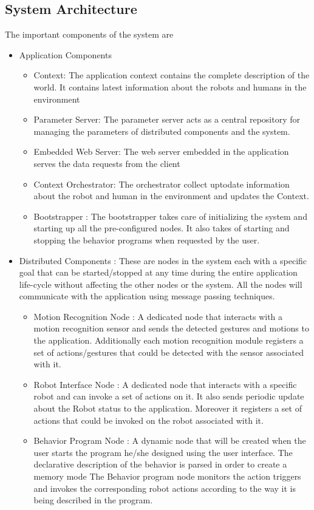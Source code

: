 \documentclass{llncs}
\begin{document}
\subsection{System Architecture}
%
The important components of the system are
\begin{itemize}
\item Application Components
\begin{itemize}
\item Context: The application context contains the complete description of the world. It contains latest information about the robots and humans in the environment
\item Parameter Server: The parameter server acts as a central repository for managing the parameters of distributed components and the system.
\item Embedded Web Server: The web server embedded in the application serves the data requests from the client
\item Context Orchestrator: The orchestrator collect uptodate information about the robot and human in the environment and updates the Context.
\item Bootstrapper : The bootstrapper takes care of initializing the system and starting up all the pre-configured nodes. It also takes of starting and stopping the behavior programs when requested by the user.
\end{itemize}
\item Distributed Components : These are nodes in the system each with a specific goal that can be started/stopped at any time during the entire application life-cycle without affecting the other nodes or the system. All the nodes will communicate with the application using message passing techniques.
\begin{itemize}
\item Motion Recognition Node : A dedicated node that interacts with a motion recognition sensor and sends the detected gestures and motions to the application. Additionally each motion recognition module registers a set of actions/gestures that could be detected with the sensor associated with it.
\item Robot Interface Node : A dedicated node that interacts with a specific robot and can invoke a set of actions on it. It also sends periodic update about the Robot status to the application. Moreover it registers a set of actions that could be invoked on the robot associated with it.
\item Behavior Program Node : A dynamic node that will be created when the user starts the program he/she designed using the user interface. The declarative description of the behavior is parsed in order to create a memory mode The Behavior program node monitors the action triggers and invokes the corresponding robot actions according to the way it is being described in the program.

\end{itemize}
\end{itemize}
\end{document}
